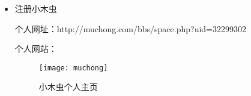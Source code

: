 \documentclass{article}
\begin{document}
\begin{itemize}
     \item 注册小木虫\par
    个人网址：http://muchong.com/bbs/space.php?uid=32299302\par
    个人网站：
    
    \begin{figure}[h!]
    \centering
    \texttt{[image: muchong]}
    \caption{小木虫个人主页}
    \label{fig:muchong}
    \end{figure}
    
    
 
\end{itemize}


\hspace*{\fill} \\




\end{document}
